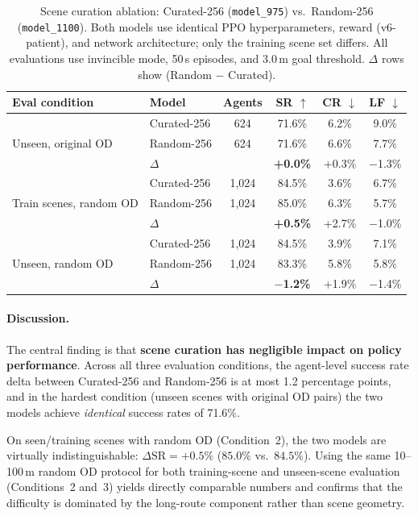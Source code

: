 \begin{table}[t]
\centering
\caption{Scene curation ablation: Curated-256 (\texttt{model\_975}) vs.\ Random-256 (\texttt{model\_1100}).
Both models use identical PPO hyperparameters, reward (v6-patient), and network architecture; only the training scene set differs.
All evaluations use invincible mode, 50\,s episodes, and 3.0\,m goal threshold.
$\Delta$ rows show (Random $-$ Curated).}
\label{tab:curation_ablation}
\small
\begin{tabular}{llcccc}
\toprule
Eval condition & Model & Agents & SR $\uparrow$ & CR $\downarrow$ & LF $\downarrow$ \\
\midrule
\multirow{3}{*}{Unseen, original OD}
  & Curated-256 & 624   & 71.6\% & 6.2\% & 9.0\% \\
  & Random-256  & 624   & 71.6\% & 6.6\% & 7.7\% \\
  & $\Delta$    &       & \textbf{+0.0\%} & +0.3\% & $-$1.3\% \\
\midrule
\multirow{3}{*}{Train scenes, random OD}
  & Curated-256 & 1{,}024 & 84.5\% & 3.6\% & 6.7\% \\
  & Random-256  & 1{,}024 & 85.0\% & 6.3\% & 5.7\% \\
  & $\Delta$    &         & \textbf{+0.5\%} & +2.7\% & $-$1.0\% \\
\midrule
\multirow{3}{*}{Unseen, random OD}
  & Curated-256 & 1{,}024 & 84.5\% & 3.9\% & 7.1\% \\
  & Random-256  & 1{,}024 & 83.3\% & 5.8\% & 5.8\% \\
  & $\Delta$    &         & \textbf{$-$1.2\%} & +1.9\% & $-$1.4\% \\
\bottomrule
\end{tabular}
\end{table}

\paragraph{Discussion.}
The central finding is that \textbf{scene curation has negligible impact on policy performance}.
Across all three evaluation conditions, the agent-level success rate delta between Curated-256 and Random-256 is at most 1.2 percentage points, and in the hardest condition (unseen scenes with original OD pairs) the two models achieve \emph{identical} success rates of 71.6\%.

On seen/training scenes with random OD (Condition~2), the two models are virtually indistinguishable: $\Delta\text{SR} = {+}0.5\%$ ($85.0\%$ vs.\ $84.5\%$).
Using the same 10--100\,m random OD protocol for both training-scene and unseen-scene evaluation (Conditions~2 and~3) yields directly comparable numbers and confirms that the difficulty is dominated by the long-route component rather than scene geometry.

